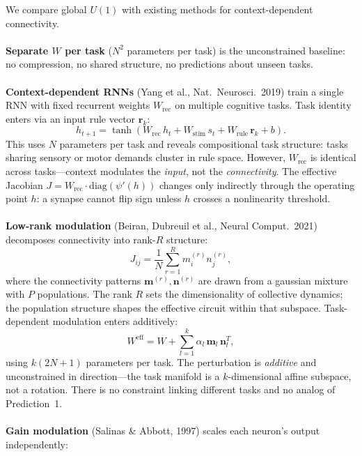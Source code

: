 \documentclass[11pt,a4paper]{article}
\newcommand{\Weff}{W^{\text{eff}}}
\begin{document}
{We compare global $U(1)$ with existing methods for context-dependent connectivity.
\\
\\
\textbf{Separate $W$ per task} ($N^2$ parameters per task) is the unconstrained baseline: no compression, no shared structure, no predictions about unseen tasks.
\\
\\
\textbf{Context-dependent RNNs} (Yang et al., Nat.\ Neurosci.\ 2019) train a single RNN with fixed recurrent weights $W_{\text{rec}}$ on multiple cognitive tasks. Task identity enters via an input rule vector $\mathbf{r}_k$:
\begin{equation}
h_{t+1} = \tanh(W_{\text{rec}}\, h_t + W_{\text{stim}}\, s_t + W_{\text{rule}}\, \mathbf{r}_k + b).
\end{equation}
This uses $N$ parameters per task and reveals compositional task structure: tasks sharing sensory or motor demands cluster in rule space. However, $W_{\text{rec}}$ is identical across tasks---context modulates the \emph{input}, not the \emph{connectivity}. The effective Jacobian $J = W_{\text{rec}} \cdot \text{diag}(\psi'(h))$ changes only indirectly through the operating point $h$: a synapse cannot flip sign unless $h$ crosses a nonlinearity threshold.
\\
\\
\textbf{Low-rank modulation} (Beiran, Dubreuil et al., Neural Comput.\ 2021) decomposes connectivity into rank-$R$ structure:
\begin{equation}
J_{ij} = \frac{1}{N}\sum_{r=1}^{R} m_i^{(r)} n_j^{(r)},
\end{equation}
where the connectivity patterns $\mathbf{m}^{(r)}, \mathbf{n}^{(r)}$ are drawn from a gaussian mixture with $P$ populations. The rank $R$ sets the dimensionality of collective dynamics; the population structure shapes the effective circuit within that subspace. Task-dependent modulation enters additively:
\begin{equation}
\Weff = W + \sum_{l=1}^{k} \alpha_l\, \mathbf{m}_l\,\mathbf{n}_l^T,
\end{equation}
using $k(2N+1)$ parameters per task. The perturbation is \emph{additive} and unconstrained in direction---the task manifold is a $k$-dimensional affine subspace, not a rotation. There is no constraint linking different tasks and no analog of Prediction~1.
\\
\\
\textbf{Gain modulation} (Salinas \& Abbott, 1997) scales each neuron's output independently:
}
\end{document}
